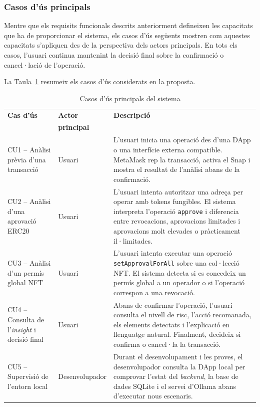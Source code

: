 \subsubsection{Casos d’ús principals}

Mentre que els requisits funcionals descrits anteriorment defineixen les capacitats que ha de proporcionar el sistema, els casos d’ús següents mostren com aquestes capacitats s’apliquen des de la perspectiva dels actors principals. En tots els casos, l’usuari continua mantenint la decisió final sobre la confirmació o cancel·lació de l’operació.

La Taula~\ref{tab:casos_us} resumeix els casos d’ús considerats en la proposta.

\begin{table}[H]
\centering
\small
\renewcommand{\arraystretch}{1.25}
\begin{tabularx}{\textwidth}{p{} p{} X}
\hline
\textbf{Cas d’ús} & \textbf{Actor} & \textbf{Descripció} \\
\textbf{} & \textbf{principal} & \textbf{} \\
\hline

CU1 -- Anàlisi prèvia d’una transacció &
Usuari &
L’usuari inicia una operació des d’una DApp o una interfície externa compatible. MetaMask rep la transacció, activa el Snap i mostra el resultat de l’anàlisi abans de la confirmació. \\

CU2 -- Anàlisi d’una aprovació ERC20 &
Usuari &
L’usuari intenta autoritzar una adreça per operar amb tokens fungibles. El sistema interpreta l’operació \texttt{approve} i diferencia entre revocacions, aprovacions limitades i aprovacions molt elevades o pràcticament il·limitades. \\

CU3 -- Anàlisi d’un permís global NFT &
Usuari &
L’usuari intenta executar una operació \texttt{setApprovalForAll} sobre una col·lecció NFT. El sistema detecta si es concedeix un permís global a un operador o si l’operació correspon a una revocació. \\

CU4 -- Consulta de l’\textit{insight} i decisió final &
Usuari &
Abans de confirmar l’operació, l’usuari consulta el nivell de risc, l’acció recomanada, els elements detectats i l’explicació en llenguatge natural. Finalment, decideix si confirma o cancel·la la transacció. \\

CU5 -- Supervisió de l’entorn local &
Desenvolupador &
Durant el desenvolupament i les proves, el desenvolupador consulta la DApp local per comprovar l’estat del \textit{backend}, la base de dades SQLite i el servei d’Ollama abans d’executar nous escenaris. \\
\hline
\end{tabularx}
\caption{Casos d’ús principals del sistema}
\label{tab:casos_us}
\end{table}

